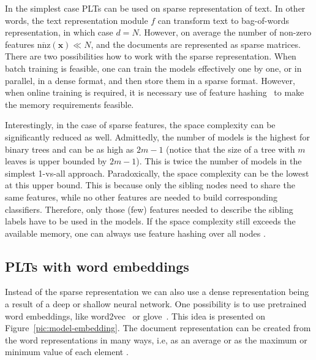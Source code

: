 \documentclass{article}
\renewcommand{\vec}[1]{\boldsymbol{#1}}
\newcommand{\bx}{\vec{x}}
\newcommand{\sectionBefore}{-0pt}
\newcommand{\sectionAfter}{-0pt}
\begin{document}
In the simplest case PLTs can be used on sparse representation of text. In other words, the text representation module $f$ can transform text to bag-of-words representation, in which case $d=N$. However, on average the number of non-zero features $\overline{\mathrm{nnz}}(\bx) \ll N$, and the documents are represented as sparse matrices. %
There are two possibilities how to work with the sparse representation. When batch training is feasible, one can train the models effectively one by one, or in parallel, in a dense format, and then store them in a sparse format. However, when online training is required, it is necessary use of feature hashing~\citep{Weinberger_et_al_2009} to make the memory requirements feasible. 

Interestingly, in the case of sparse features, the space complexity can be significantly reduced as well. Admittedly, the number of models is the highest for binary trees and can be as high as $2m-1$ (notice that the size of a tree with $m$ leaves is upper bounded by $2m-1$). This is twice the number of models in the simplest 1-vs-all approach. Paradoxically, the space complexity can be the lowest at this upper bound. This is because only the sibling nodes need to share the same features, while no other features are needed to build corresponding classifiers. Therefore, only those (few) features needed to describe the sibling labels have to be used in the models. If the space complexity still exceeds the available memory, one can always use feature hashing over all nodes \cite{Weinberger_et_al_2009}.


\vspace{\sectionBefore}
\subsection{PLTs with word embeddings}
\label{sec:sparse_input}
\vspace{\sectionAfter}

Instead of the sparse representation we can also use a dense representation being a result of a deep or shallow neural network.
One possibility is to use pretrained word embeddings, like word2vec~\citep{word2vec} or glove~\citep{glove}. This idea is presented on Figure~\ref{pic:model-embedding}. The document representation can be created from the word representations in many ways, i.e, as an average \cite{!} or as the maximum or minimum value of each element \cite{!}.
\end{document}

